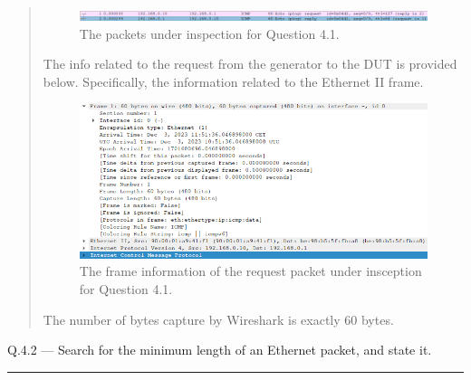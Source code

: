 \documentclass{article}
\newcommand\Que[2]{%
   \begin{samepage}
   \leavevmode\par
   \noindent
   Q.#1 --- #2\par\vspace{10pt}\hrule\vspace{10pt}
   \end{samepage}}
\newenvironment{ans}
   {\fbox{Answer}\begin{quote}\nopagebreak}
   {\end{quote}}
\begin{document}
\begin{ans}
\begin{figure}[H]
\centering
\includegraphics[width=16cm]{data/q4.1-packets-under-inspection.png}
\caption{The packets under inspection for Question 4.1.}
\end{figure}

The info related to the request from the generator to the
DUT is provided below. Specifically, the information
related to the Ethernet II frame.

\begin{figure}[H]
\centering
\includegraphics[width=16cm]{data/q4.1-request-info.png}
\caption{The frame information of the request packet under
insception for Question 4.1.}
\end{figure}

The number of bytes capture by Wireshark is exactly 60
bytes.
\end{ans}

\Que{4.2}{Search for the minimum length of an Ethernet packet,
and state it.}
\end{document}
